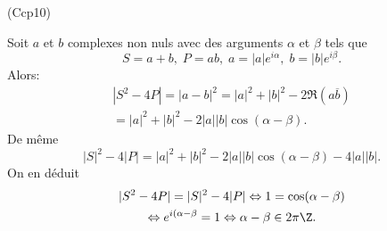 \begin{tiny} (Ccp10) \end{tiny} Soit $a$ et $b$ complexes non nuls avec des arguments $\alpha$ et $\beta$ tels que
\[
 S = a + b, \; P = ab, \;
 a = |a|e^{i\alpha}, \; b = |b|e^{i\beta}.
\]
Alors:
\begin{multline*}
 |S^2 - 4P| = |a-b|^2 = |a|^2 + |b|^2 - 2\Re(a\overline{b})\\
 = |a|^2 + |b|^2 - 2|a||b|\cos(\alpha - \beta).
\end{multline*}
De même
\[
 |S|^2 - 4|P| = |a|^2 + |b|^2 - 2|a||b|\cos(\alpha - \beta) - 4|a||b|.
\]
On en déduit
\begin{multline*}
 |S^2 - 4P| = |S|^2 - 4|P|
 \Leftrightarrow
 1 = \cos(\alpha - \beta) \\
 \Leftrightarrow
 e^{i(\alpha - \beta} = 1
 \Leftrightarrow
 \alpha - \beta \in 2\pi \Z.
\end{multline*}
